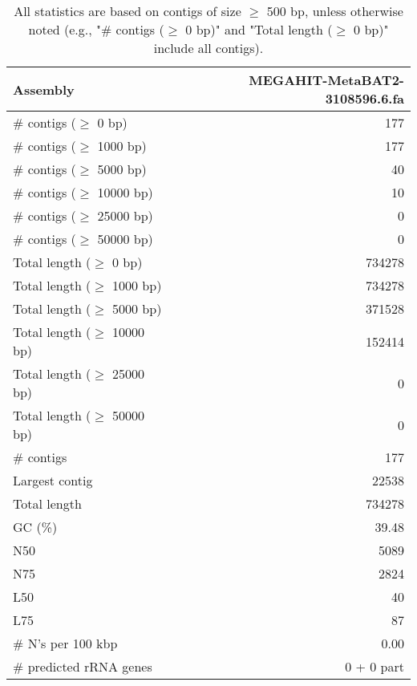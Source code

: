\documentclass[12pt,a4paper]{article}
\begin{document}
\begin{table}[ht]
\begin{center}
\caption{All statistics are based on contigs of size $\geq$ 500 bp, unless otherwise noted (e.g., "\# contigs ($\geq$ 0 bp)" and "Total length ($\geq$ 0 bp)" include all contigs).}
\begin{tabular}{|l*{1}{|r}|}
\hline
Assembly & MEGAHIT-MetaBAT2-3108596.6.fa \\ \hline
\# contigs ($\geq$ 0 bp) & 177 \\ \hline
\# contigs ($\geq$ 1000 bp) & 177 \\ \hline
\# contigs ($\geq$ 5000 bp) & 40 \\ \hline
\# contigs ($\geq$ 10000 bp) & 10 \\ \hline
\# contigs ($\geq$ 25000 bp) & 0 \\ \hline
\# contigs ($\geq$ 50000 bp) & 0 \\ \hline
Total length ($\geq$ 0 bp) & 734278 \\ \hline
Total length ($\geq$ 1000 bp) & 734278 \\ \hline
Total length ($\geq$ 5000 bp) & 371528 \\ \hline
Total length ($\geq$ 10000 bp) & 152414 \\ \hline
Total length ($\geq$ 25000 bp) & 0 \\ \hline
Total length ($\geq$ 50000 bp) & 0 \\ \hline
\# contigs & 177 \\ \hline
Largest contig & 22538 \\ \hline
Total length & 734278 \\ \hline
GC (\%) & 39.48 \\ \hline
N50 & 5089 \\ \hline
N75 & 2824 \\ \hline
L50 & 40 \\ \hline
L75 & 87 \\ \hline
\# N's per 100 kbp & 0.00 \\ \hline
\# predicted rRNA genes & 0 + 0 part \\ \hline
\end{tabular}
\end{center}
\end{table}
\end{document}
